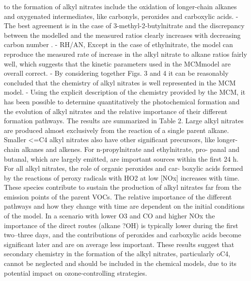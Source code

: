 \documentclass[11pt,a4paper]{article}
\begin{document}
to the formation of alkyl nitrates include the oxidation of longer-chain alkanes and oxygenated intermediates, like carbonyls, peroxides and carboxylic acids.
- The best agreement is in the case of 3-methyl-2-butylnitrate and the discrepancy between the modelled and the measured ratios clearly increases with decreasing carbon number .
- RH/AN, Except in the case of ethylnitrate, the model can reproduce the measured rate of increase in the alkyl nitrate to alkane ratios fairly well, which suggests that the kinetic parameters used in the MCMmodel are overall correct.
- By considering together Figs. 3 and 4 it can be reasonably concluded that the chemistry of alkyl nitrates is well represented in the MCM model.
- Using the explicit description of the chemistry provided by the MCM, it has been possible to determine quantitatively the photochemical formation and the evolution of alkyl nitrates and the relative importance of their different formation pathways. The results are summarized in Table 2. Large alkyl nitrates are produced almost exclusively from the reaction of a single parent
alkane. Smaller <=C4 alkyl nitrates also have other significant precursors, like longer-chain alkanes and alkenes. For n-propylnitrate and ethylnitrate, pro- panal and butanal, which are largely emitted, are important sources within the first 24 h. For all alkyl nitrates, the role of organic peroxides and car- boxylic acids formed by the reactions of peroxy radicals with HO2 at low [NOx] increases with time. These species contribute to sustain the production of alkyl nitrates far from the emission points of the parent VOCs. The relative importance of the different pathways
and how they change with time are dependent on the initial conditions of the model. In a scenario with lower O3 and CO and higher NOx the
importance of the direct routes (alkane ?OH) is typically lower during the first two–three days, and the contributions of peroxides and carboxylic acids become significant later and are on average less important. These results suggest that secondary chemistry in the formation of the alkyl nitrates, particularly oC4, cannot be neglected and should be included in the chemical models, due to its potential impact on ozone-controlling strategies.
\end{document}
